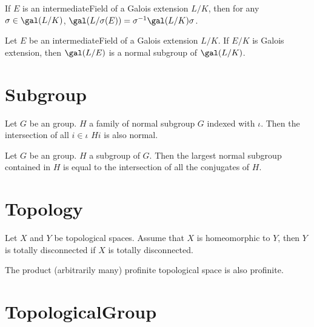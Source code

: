 \begin{theorem}
	\leanok
	If $E$ is an intermediateField of a Galois extension $L / K$, then for any $ \sigma \in \gal(L / K) $, $ \gal(L / \sigma(E)) = \sigma^{-1}\gal(L / K)\sigma $.
\end{theorem}

\begin{theorem}
	\leanok
	Let $E$ be an intermediateField of a Galois extension $L / K$. If $ E / K $ is  
	Galois extension, then $ \gal(L / E) $ is a normal subgroup of $ \gal(L / K) $.
\end{theorem}

\section{Subgroup}

\begin{theorem}
	\leanok
	Let $G$ be an group. $H$ a family of normal subgroup $G$ indexed with $\iota$. Then the intersection of all $i \in \iota$ $H i$ is also normal.
\end{theorem}

\begin{theorem}
	\leanok
	Let $G$ be an group. $H$ a subgroup of $G$. Then the largest normal subgroup contained in $H$ is equal to the intersection of all the conjugates of $H$.
\end{theorem}

\section{Topology}

\begin{lemma}
	\leanok
	Let $ X $ and $ Y $ be topological spaces. Assume that $ X $ is homeomorphic to $ Y $, then $ Y $ is totally disconnected if $ X $ is totally disconnected.
\end{lemma}

\begin{theorem}
	\leanok
	The product (arbitrarily many) profinite topological space is also profinite.
\end{theorem}

\section{TopologicalGroup}

